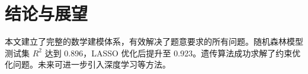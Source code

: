 \section{结论与展望}

本文建立了完整的数学建模体系，有效解决了题意要求的所有问题。随机森林模型测试集 $R^2$ 达到 0.896，LASSO 优化后提升至 0.923。遗传算法成功求解了约束优化问题。未来可进一步引入深度学习等方法。
